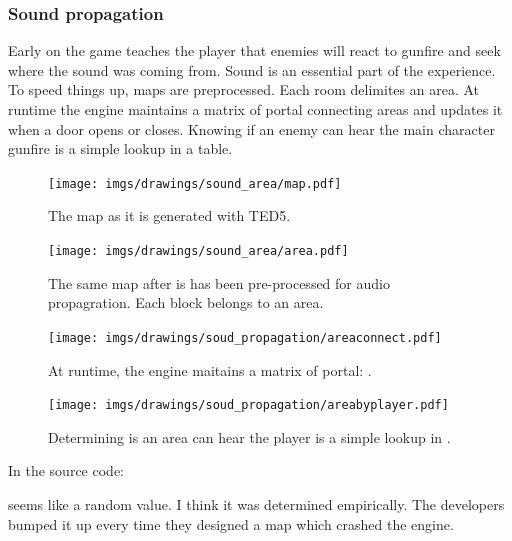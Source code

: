 \subsubsection{Sound propagation}
Early on the game teaches the player that enemies will react to gunfire and seek where the sound was coming from. Sound is an essential part of the experience. To speed things up, maps are preprocessed. Each room delimites an area. At runtime the engine maintains a matrix of portal connecting areas and updates it when a door opens or closes. Knowing if an enemy can hear the main character gunfire is a simple lookup in a table.

\par
\begin{figure}[H]
 \centering
 \texttt{[image: imgs/drawings/sound\_area/map.pdf]}
 \caption{The map as it is generated with TED5.}
\end{figure}
\par

\par
\begin{figure}[H]
 \centering
 \texttt{[image: imgs/drawings/sound\_area/area.pdf]}
 \caption{The same map after is has been pre-processed for audio propagration. Each block belongs to an area.}
\end{figure}
\par



\begin{figure}[H]
 \centering
 \texttt{[image: imgs/drawings/soud\_propagation/areaconnect.pdf]}
 \caption{At runtime, the engine maitains a matrix of portal: .}
\end{figure}
\par

\par
\begin{figure}[H]
 \centering
 \texttt{[image: imgs/drawings/soud\_propagation/areabyplayer.pdf]}
 \caption{Determining is an area can hear the player is a simple lookup in .}
\end{figure}
\par
In the source code:\\
\par
\begin{minipage}{\textwidth}

\end{minipage}
\par
{} seems like a random value. I think it was determined empirically. The developers bumped it up every time they designed a map which crashed the engine.\\
\par








